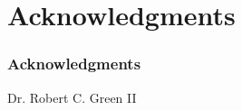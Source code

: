 
\section*{Acknowledgments}

\begin{frame}
  \frametitle{Acknowledgments}
  Dr. Robert C. Green II
\end{frame}